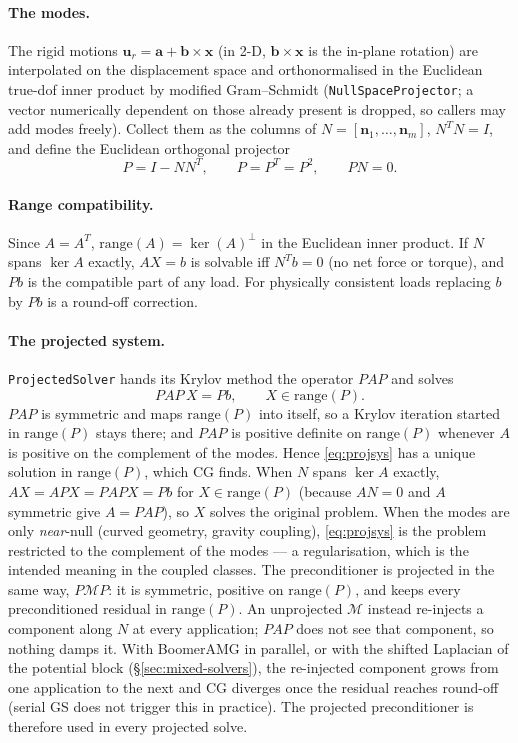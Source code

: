 \documentclass[11pt]{article}
\numberwithin{equation}{section}
\theoremstyle{remark}
\newcommand{\vu}{\mathbf{u}}
\newcommand{\vx}{\mathbf{x}}
\newcommand{\code}[1]{\texttt{#1}}
\begin{document}
\paragraph{The modes.} The rigid motions $\vu_r = \mathbf{a} +
\mathbf{b}\times\vx$ (in 2-D, $\mathbf{b}\times\vx$ is the in-plane
rotation) are interpolated on the displacement space and orthonormalised
in the Euclidean true-dof inner product by modified Gram--Schmidt
(\code{NullSpaceProjector}; a vector numerically dependent on those
already present is dropped, so callers may add modes freely). Collect them
as the columns of $N = [\mathbf{n}_1,\dots,\mathbf{n}_m]$, $N^TN = I$, and
define the Euclidean orthogonal projector
\begin{equation}
  P = I - NN^T, \qquad P = P^T = P^2, \qquad PN = 0 .
  \label{eq:projector}
\end{equation}

\paragraph{Range compatibility.} Since $A = A^T$, $\mathrm{range}(A) =
\ker(A)^\perp$ in the Euclidean inner product. If $N$ spans $\ker A$
exactly, $AX = b$ is solvable iff $N^Tb = 0$ (no net force or torque), and
$Pb$ is the compatible part of any load. For physically consistent loads
replacing $b$ by $Pb$ is a round-off correction.

\paragraph{The projected system.} \code{ProjectedSolver} hands its Krylov
method the operator $PAP$ and solves
\begin{equation}
  PAP\,X = Pb, \qquad X\in\mathrm{range}(P) .
  \label{eq:projsys}
\end{equation}
$PAP$ is symmetric and maps $\mathrm{range}(P)$ into itself, so a Krylov
iteration started in $\mathrm{range}(P)$ stays there; and $PAP$ is
positive definite on $\mathrm{range}(P)$ whenever $A$ is positive on the
complement of the modes. Hence \eqref{eq:projsys} has a unique solution in
$\mathrm{range}(P)$, which CG finds. When $N$ spans $\ker A$ exactly,
$AX = APX = PAPX = Pb$ for $X\in\mathrm{range}(P)$ (because $AN = 0$ and
$A$ symmetric give $A = PAP$), so $X$ solves the original problem. When the
modes are only \emph{near}-null (curved geometry, gravity coupling),
\eqref{eq:projsys} is the problem restricted to the complement of the
modes --- a regularisation, which is the intended meaning in the coupled
classes. The preconditioner is projected in the same way, $P\mathcal{M}P$:
it is symmetric, positive on $\mathrm{range}(P)$, and keeps every
preconditioned residual in $\mathrm{range}(P)$. An unprojected
$\mathcal{M}$ instead re-injects a component along $N$ at every
application; $PAP$ does not see that component, so nothing damps it. With
BoomerAMG in parallel, or with the shifted Laplacian of the potential block
(\S\ref{sec:mixed-solvers}), the re-injected component grows from one
application to the next and CG diverges once the residual reaches
round-off (serial GS does not trigger this in practice). The projected
preconditioner is therefore used in every projected solve.
\end{document}
